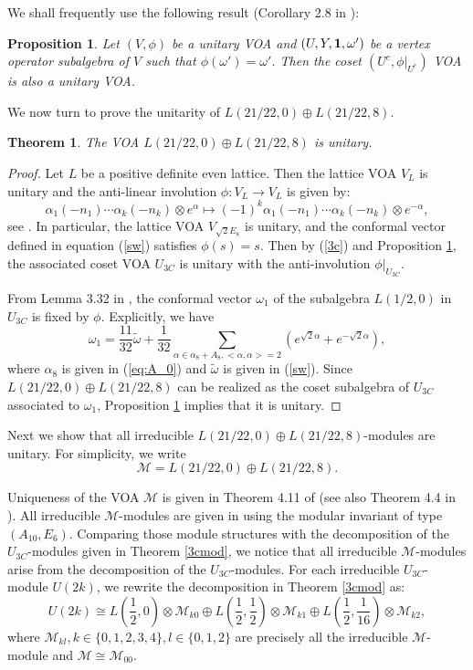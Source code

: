 \documentclass{article}
\newtheorem{theorem}[lemma]{Theorem}
\newtheorem{proposition}[lemma]{Proposition}
\def\1{{\bf 1}}
\def \w{\omega}
\begin{document}
We shall frequently use the following result (Corollary 2.8 in \cite{DLin1}):
\begin{proposition}\label{coset}
	Let $(V,\phi)$ be a unitary VOA and $(U, Y, \1, \w')$ be a vertex operator subalgebra of $V$ such that  $\phi(\w')=\w'$. Then the coset  $(U^c, \phi|_{U^c})$ VOA is also a unitary VOA.
\end{proposition}

We now turn to prove the unitarity of $L(21/22, 0)\oplus L(21/22, 8)$.
\begin{theorem}\label{c9unitary}
	The VOA $L(21/22, 0)\oplus L(21/22, 8)$ is unitary.
\end{theorem}
\begin{proof}
	Let $L$ be a positive definite even lattice. Then the lattice VOA $V_L$ is unitary and the anti-linear involution $\phi: V_L \to V_L$ is given by:
	$$\alpha_1(-n_1)\cdots\alpha_k(-n_k)\otimes e^{\alpha}\mapsto (-1)^k\alpha_1(-n_1)\cdots\alpha_k(-n_k)\otimes
	e^{-\alpha},$$
	see \cite{DLin1}.
	In particular, the lattice VOA $V_{\sqrt{2}E_8}$ is unitary, and the conformal vector defined in equation (\ref{sw}) satisfies $\phi(s)=s$.  Then by (\ref{3c}) and Proposition \ref{coset}, the associated coset VOA $U_{3C}$ is unitary with the anti-involution $\phi|_{U_{3C}}$.
	
	From Lemma 3.32 in \cite{LYY}, the conformal vector $\omega_1$ of the subalgebra $L(1/2, 0)$ in $U_{3C}$ is fixed by $\phi$. Explicitly, we have
	\begin{equation*}
		\omega_1=\frac{11}{32}\tilde{\omega}+\frac{1}{32}\sum_{\alpha \in \alpha_8+A_8, <\alpha, \alpha>=2}(e^{\sqrt{2}\alpha}+e^{-\sqrt{2}\alpha}),
	\end{equation*}
	where $\alpha_8$ is given in (\ref{eq:A_0}) and $\tilde{\omega}$ is given in (\ref{sw}). Since $L(21/22, 0)\oplus L(21/22, 8)$ can be realized as the coset subalgebra of $U_{3C}$ associated to $\w_1$, Proposition \ref{coset} implies that it is unitary.
\end{proof}

Next we show that all irreducible  $L(21/22, 0)\oplus L(21/22, 8)$-modules are unitary. For simplicity, we write $$\mathcal{M}=L(21/22, 0)\oplus L(21/22, 8).$$

Uniqueness of the VOA $\mathcal M$ is given in Theorem 4.11 of \cite{DLin2} (see also Theorem 4.4 in \cite{DZh}). All irreducible $\mathcal{M}$-modules are given in \cite{DLin2} using the modular invariant of type $(A_{10}, E_6)$. Comparing those module structures with the decomposition of the $U_{3C}$-modules given in Theorem \ref{3cmod}, we notice that all irreducible $\mathcal{M}$-modules arise from the decomposition of the $U_{3C}$-modules. For each irreducible $U_{3C}$-module $U(2k)$, we rewrite the decomposition in Theorem \ref{3cmod} as:
\begin{equation}\label{U2k}
	U(2k)\cong L(\frac{1}{2}, 0)\otimes \mathcal{M}_{k0}\oplus L(\frac{1}{2}, \frac{1}{2})\otimes \mathcal{M}_{k1}\oplus L(\frac{1}{2}, \frac{1}{16})\otimes \mathcal{M}_{k2},
\end{equation}
where $\mathcal{M}_{kl}, k\in\{0, 1, 2, 3, 4\}, l\in\{0, 1, 2\}$ are precisely all the irreducible $\mathcal{M}$-module and $\mathcal{M}\cong \mathcal{M}_{00}$.
\end{document}
